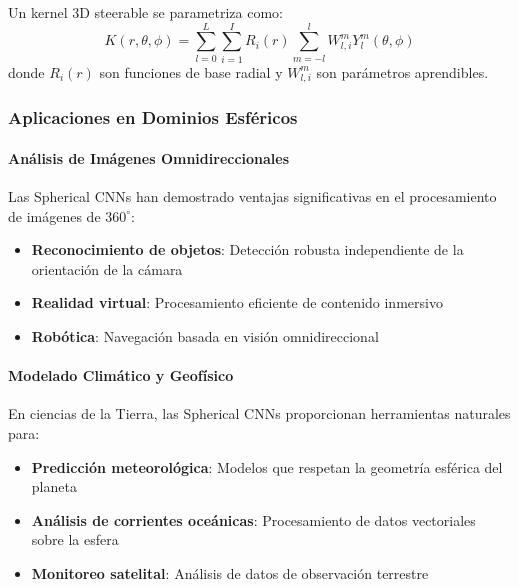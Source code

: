 \begin{definition}
Un kernel 3D steerable se parametriza como:
\begin{equation}
K(r, \theta, \phi) = \sum_{l=0}^{L} \sum_{i=1}^{I} R_i(r) \sum_{m=-l}^{l} W_{l,i}^m Y_l^m(\theta, \phi)
\end{equation}
donde $R_i(r)$ son funciones de base radial y $W_{l,i}^m$ son parámetros aprendibles.
\end{definition}

\subsubsection{Aplicaciones en Dominios Esféricos}

\paragraph{Análisis de Imágenes Omnidireccionales}

Las Spherical CNNs han demostrado ventajas significativas en el procesamiento de imágenes de $360^\circ$:

\begin{itemize}
    \item \textbf{Reconocimiento de objetos}: Detección robusta independiente de la orientación de la cámara
    \item \textbf{Realidad virtual}: Procesamiento eficiente de contenido inmersivo
    \item \textbf{Robótica}: Navegación basada en visión omnidireccional
\end{itemize}

\paragraph{Modelado Climático y Geofísico}

En ciencias de la Tierra, las Spherical CNNs proporcionan herramientas naturales para:

\begin{itemize}
    \item \textbf{Predicción meteorológica}: Modelos que respetan la geometría esférica del planeta
    \item \textbf{Análisis de corrientes oceánicas}: Procesamiento de datos vectoriales sobre la esfera
    \item \textbf{Monitoreo satelital}: Análisis de datos de observación terrestre
\end{itemize}

